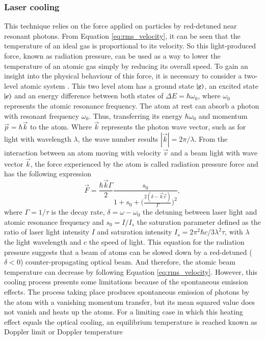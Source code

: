 \subsubsection{Laser cooling}

This technique relies on the force applied on particles by red-detuned near resonant photons. From Equation \eqref{eq:rms_velocity}, it can be seen that the temperature of an ideal gas is proportional to its velocity. So this light-produced force, known as radiation pressure, can be used as a way to lower the temperature of an atomic gas simply by reducing its overall speed. To gain an insight into the physical behaviour of this force, it is necessary to consider a two-level atomic system \cite{Metcalf1999}. This two level atom has a ground state $\ket{g}$, an excited state $\ket{e}$ and an energy difference between both states of $\Delta E = \hbar \omega_0$, where $\omega_0$ represents the atomic resonance frequency. The atom at rest can absorb a photon with resonant frequency $\omega_0$. Thus, transferring its energy $\hbar \omega_0$ and momentum $\vec{p}= \hbar \vec{k}$ to the atom. Where $\vec{k}$ represents the photon wave vector, such as for light with wavelength $\lambda$, the wave number results $|\vec{k}| = 2 \pi / \lambda$. From the interaction between an atom moving with velocity $\vec{v}$ and a beam light with wave vector $\vec{k}$, the force experienced by the atom is called radiation pressure force and has the following expression \cite{Metcalf1999}
\begin{equation}\label{eq:radiation_pressure}
	\vec{F} = \frac{\hbar \vec{k} \Gamma}{2} \frac{s_0}{1 + s_0 + \Big(\frac{2(\delta-\vec{k}\vec{v})}{\Gamma}\Big)^2},
\end{equation}
where $\Gamma = 1/\tau$ is the decay rate, $\delta = \omega - \omega_0$ the detuning between laser light and atomic resonance  frequency and $s_0 = I / I_s$ the saturation parameter defined as the ratio of laser light intensity $I$ and saturation intensity $I_s = 2 \pi^2 \hbar c/ 3 \lambda^2 \tau$, with $\lambda$ the light wavelength and $c$ the speed of light. This equation for the radiation pressure suggests that a beam of atoms can be slowed down by a red-detuned ($\delta < 0$) counter-propagating optical beam. And therefore, the atomic beam temperature can decrease by following Equation \eqref{eq:rms_velocity}. However, this cooling process presents some limitations because of the spontaneous emission effects. The process taking place produces spontaneous emission of photons by the atom with a vanishing momentum transfer, but its mean squared value does not vanish and heats up the atoms. For a limiting case in which this heating effect equals the optical cooling, an equilibrium temperature is reached known as Doppler limit or Doppler temperature 
